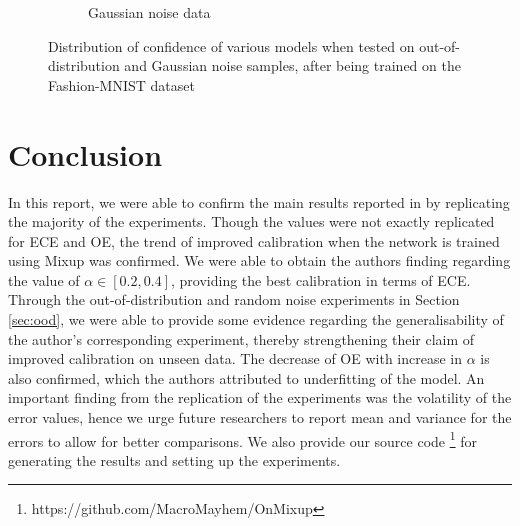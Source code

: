 \documentclass{article}
\begin{document}
\begin{figure}[h]
\begin{subfigure}[b]{0.45\textwidth}
         \caption{Gaussian noise data}
     \end{subfigure}
        \caption{Distribution of confidence of various models when tested on out-of-distribution and Gaussian noise samples, after being trained on the Fashion-MNIST dataset}
        \label{fig:out_dist}
\end{figure}


\section{Conclusion}
\label{sec:conclusion}
In this report, we were able to confirm the main
results reported in \cite{onmixup} by replicating the majority of the experiments. Though the values were not exactly replicated for ECE and OE, the trend of improved calibration when the network is trained using Mixup was confirmed. We were able to obtain the authors finding regarding the value of $\alpha \in [0.2, 0.4]$, providing the best calibration in terms of ECE. Through the out-of-distribution and random noise experiments in Section \ref{sec:ood}, we were able to provide some evidence regarding the generalisability of the author's corresponding experiment, thereby strengthening their claim of improved calibration on unseen data. The decrease of OE with increase in $\alpha$ is also confirmed, which the authors attributed to underfitting of the model. An important finding from the replication of the experiments was the volatility of the error values, hence we urge future researchers to report mean and variance for the errors to allow for better comparisons. We also provide our source code \footnote{https://github.com/MacroMayhem/OnMixup} for generating the results and setting up the experiments.


\end{document}
